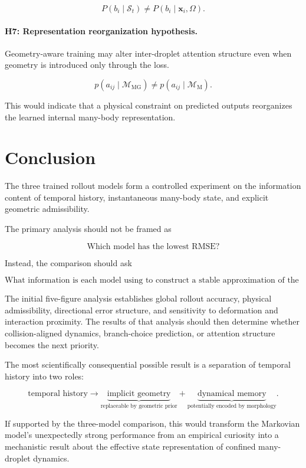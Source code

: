 \documentclass[11pt]{article}
\newcommand{\x}{\mathbf{x}}
\newcommand{\Mmark}{\mathcal{M}_{\mathrm{M}}}
\newcommand{\Mgeom}{\mathcal{M}_{\mathrm{MG}}}
\begin{document}
\begin{equation}
P
\left(
b_i
\mid
\mathcal{S}_t
\right)
\neq
P
\left(
b_i
\mid
\x_i,\Omega
\right).
\end{equation}

\paragraph{H7: Representation reorganization hypothesis.}
Geometry-aware training may alter inter-droplet attention structure even when geometry is introduced only through the loss.

\begin{equation}
p
\left(
a_{ij}
\mid
\Mgeom
\right)
\neq
p
\left(
a_{ij}
\mid
\Mmark
\right).
\end{equation}

This would indicate that a physical constraint on predicted outputs reorganizes the learned internal many-body representation.

\section{Conclusion}

The three trained rollout models form a controlled experiment on the information content of temporal history, instantaneous many-body state, and explicit geometric admissibility.

The primary analysis should not be framed as

\begin{equation}
\text{Which model has the lowest RMSE?}
\end{equation}

Instead, the comparison should ask

\begin{equation}
\text{What information is each model using to construct a stable approximation of the droplet dynamics?}
\end{equation}

The initial five-figure analysis establishes global rollout accuracy, physical admissibility, directional error structure, and sensitivity to deformation and interaction proximity. The results of that analysis should then determine whether collision-aligned dynamics, branch-choice prediction, or attention structure becomes the next priority.

The most scientifically consequential possible result is a separation of temporal history into two roles:

\begin{equation}
\boxed{
\text{temporal history}
\longrightarrow
\underbrace{\text{implicit geometry}}_{\text{replaceable by geometric prior}}
+
\underbrace{\text{dynamical memory}}_{\text{potentially encoded by morphology}}.
}
\end{equation}

If supported by the three-model comparison, this would transform the Markovian model's unexpectedly strong performance from an empirical curiosity into a mechanistic result about the effective state representation of confined many-droplet dynamics.
\end{document}

